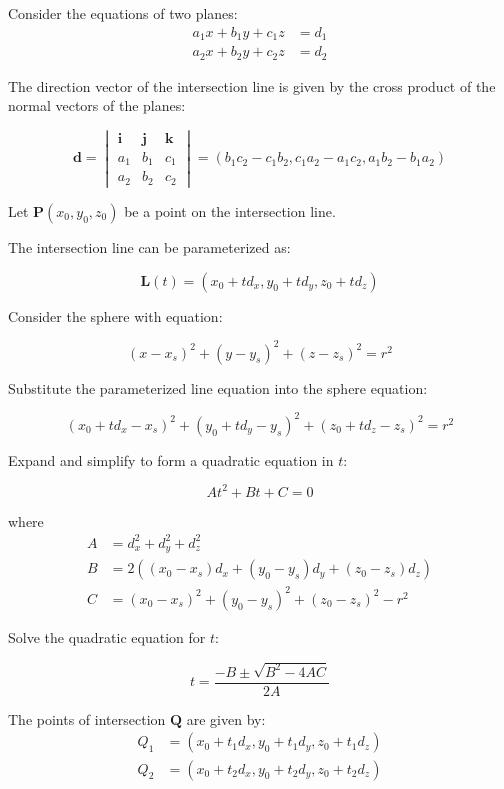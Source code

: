 \documentclass[12pt]{article}
\begin{document}
	Consider the equations of two planes:
	\begin{align}
		a_1 x + b_1 y + c_1 z &= d_1 \label{eq:plane1} \\
		a_2 x + b_2 y + c_2 z &= d_2 \label{eq:plane2}
	\end{align}
	
	The direction vector of the intersection line is given by the cross product of the normal vectors of the planes:
	
	
	\[
	\mathbf{d} = \begin{vmatrix}
		\mathbf{i} & \mathbf{j} & \mathbf{k} \\
		a_1 & b_1 & c_1 \\
		a_2 & b_2 & c_2
	\end{vmatrix} = (b_1 c_2 - c_1 b_2, c_1 a_2 - a_1 c_2, a_1 b_2 - b_1 a_2)
	\]
	
	
	
	Let \( \mathbf{P}(x_0, y_0, z_0) \) be a point on the intersection line.
	
	The intersection line can be parameterized as:
	
	
	\[
	\mathbf{L}(t) = (x_0 + t d_x, y_0 + t d_y, z_0 + t d_z)
	\]
	
	
	
	Consider the sphere with equation:
	
	
	\[
	(x - x_s)^2 + (y - y_s)^2 + (z - z_s)^2 = r^2
	\]
	
	
	
	Substitute the parameterized line equation into the sphere equation:
	
	
	\[
	(x_0 + t d_x - x_s)^2 + (y_0 + t d_y - y_s)^2 + (z_0 + t d_z - z_s)^2 = r^2
	\]
	
	
	
	Expand and simplify to form a quadratic equation in \( t \):
	
	
	\[
	A t^2 + B t + C = 0
	\]
	
	
	where
	\begin{align*}
		A &= d_x^2 + d_y^2 + d_z^2 \\
		B &= 2 \left( (x_0 - x_s) d_x + (y_0 - y_s) d_y + (z_0 - z_s) d_z \right) \\
		C &= (x_0 - x_s)^2 + (y_0 - y_s)^2 + (z_0 - z_s)^2 - r^2
	\end{align*}
	
	Solve the quadratic equation for \( t \):
	
	
	\[
	t = \frac{-B \pm \sqrt{B^2 - 4AC}}{2A}
	\]
	
	
	
	The points of intersection \( \mathbf{Q} \) are given by:
	\begin{align*}
		Q_1 &= (x_0 + t_1 d_x, y_0 + t_1 d_y, z_0 + t_1 d_z) \\
		Q_2 &= (x_0 + t_2 d_x, y_0 + t_2 d_y, z_0 + t_2 d_z)
	\end{align*}
	
	
	
	
\end{document}
